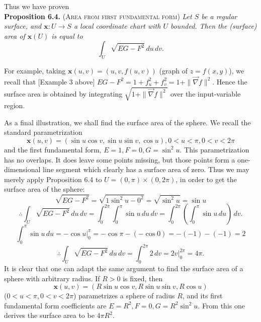 \documentclass[leqno]{book}
\begin{document}
Thus we have proven\\

\noindent\textbf{Proposition 6.4.} \textsc{(Area from first fundamental form)} \emph{Let $S$ be a regular surface, and $\mathbf x:U\to S$ a local coordinate chart with $U$ bounded.  Then the (surface) area of $\mathbf x(U)$ is equal to}
$$\int_U\sqrt{EG-F^2}\,du\,dv.$$

\noindent For example, taking $\mathbf x(u,v)=(u,v,f(u,v))$ (graph of $z=f(x,y)$), we recall that [Example 3 above] $EG-F^2=1+f_u^2+f_v^2=1+\|\vec\nabla f\|^2$.  Hence the surface area is obtained by integrating $\sqrt{1+\|\vec\nabla f\|^2}$ over the input-variable region. %

As a final illustration, we shall find the surface area of the sphere.  We recall the standard parametrization
$$\mathbf x(u,v)=(\sin u\cos v,\sin u\sin v,\cos u),0<u<\pi,0<v<2\pi$$
and the first fundamental form, $E=1,F=0,G=\sin^2u$.
This parametrization has no overlaps.  It does leave some points missing, but those points form a one-dimensional line segment which clearly has a surface area of zero.  Thus we may merely apply Proposition 6.4 to $U=(0,\pi)\times(0,2\pi)$, in order to get the surface area of the sphere:
$$\sqrt{EG-F^2}=\sqrt{1\sin^2u-0^2}=\sqrt{\sin^2u}=\sin u$$
$$\therefore\int_U\sqrt{EG-F^2}\,du\,dv=\int_0^{2\pi}\int_0^\pi\sin u\,du\,dv=\int_0^{2\pi}\left(\int_0^\pi\sin u\,du\right)\,dv.$$
$$\int_0^\pi\sin u\,du=-\cos u\big|_0^\pi=-\cos\pi-(-\cos 0)=-(-1)-(-1)=2$$
$$\therefore\int_U\sqrt{EG-F^2}\,du\,dv=\int_0^{2\pi}2\,dv=2v\big|_0^{2\pi}=4\pi.$$
It is clear that one can adapt the same argument to find the surface area of a sphere with arbitrary radius.  If $R>0$ is fixed, then
$$\mathbf x(u,v)=(R\sin u\cos v,R\sin u\sin v,R\cos u)$$
($0<u<\pi,0<v<2\pi$) parametrizes a sphere of radius $R$, and its first fundamental form coefficients are $E=R^2,F=0,G=R^2\sin^2u$.  From this one derives the surface area to be $4\pi R^2$.
\end{document}
